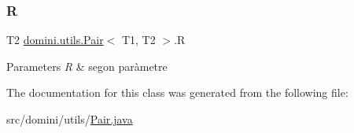 \subsubsection{\texorpdfstring{R}{R}}
{\footnotesize\ttfamily T2 \hyperlink{classdomini_1_1utils_1_1Pair}{domini.\+utils.\+Pair}$<$ T1, T2 $>$.R\hspace{0.3cm}{\ttfamily [package]}}


\begin{DoxyParams}{Parameters}
{\em R} & segon paràmetre \\
\hline
\end{DoxyParams}


The documentation for this class was generated from the following file\+:\begin{DoxyCompactItemize}
\item 
src/domini/utils/\hyperlink{Pair_8java}{Pair.\+java}\end{DoxyCompactItemize}
